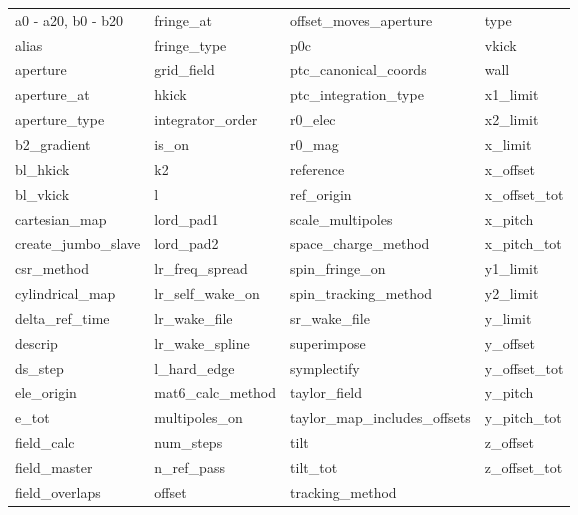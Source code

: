  \begin{tabular}{llll} \toprule
a0 - a20, b0 - b20          & fringe_at                   & offset_moves_aperture       & type                        \\
alias                       & fringe_type                 & p0c                         & vkick                       \\
aperture                    & grid_field                  & ptc_canonical_coords        & wall                        \\
aperture_at                 & hkick                       & ptc_integration_type        & x1_limit                    \\
aperture_type               & integrator_order            & r0_elec                     & x2_limit                    \\
b2_gradient                 & is_on                       & r0_mag                      & x_limit                     \\
bl_hkick                    & k2                          & reference                   & x_offset                    \\
bl_vkick                    & l                           & ref_origin                  & x_offset_tot                \\
cartesian_map               & lord_pad1                   & scale_multipoles            & x_pitch                     \\
create_jumbo_slave          & lord_pad2                   & space_charge_method         & x_pitch_tot                 \\
csr_method                  & lr_freq_spread              & spin_fringe_on              & y1_limit                    \\
cylindrical_map             & lr_self_wake_on             & spin_tracking_method        & y2_limit                    \\
delta_ref_time              & lr_wake_file                & sr_wake_file                & y_limit                     \\
descrip                     & lr_wake_spline              & superimpose                 & y_offset                    \\
ds_step                     & l_hard_edge                 & symplectify                 & y_offset_tot                \\
ele_origin                  & mat6_calc_method            & taylor_field                & y_pitch                     \\
e_tot                       & multipoles_on               & taylor_map_includes_offsets & y_pitch_tot                 \\
field_calc                  & num_steps                   & tilt                        & z_offset                    \\
field_master                & n_ref_pass                  & tilt_tot                    & z_offset_tot                \\
field_overlaps              & offset                      & tracking_method             &                             \\
 \bottomrule
 \end{tabular}
